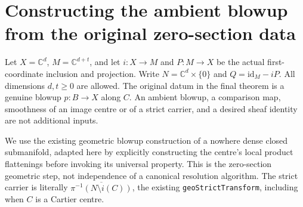 \section{Constructing the ambient blowup from the original zero-section data}

Let $X=\mathbb C^d$, $M=\mathbb C^{d+t}$, and let $i:X\to M$ and
$P:M\to X$ be the actual first-coordinate inclusion and projection. Write
$N=\mathbb C^d\times\{0\}$ and $Q=\mathrm{id}_M-iP$. All dimensions
$d,t\geq0$ are allowed. The original datum in the final theorem is a
genuine blowup $p:B\to X$ along $C$. An ambient blowup, a comparison map,
smoothness of an image centre or of a strict carrier, and a desired sheaf
identity are not additional inputs.

We use the existing geometric blowup construction of a nowhere dense
closed submanifold, adapted here by explicitly constructing the centre's
local product flattenings before invoking its universal property. This
is the zero-section geometric step, not independence of a canonical
resolution algorithm. The strict carrier is literally
$\overline{\pi^{-1}(N\setminus i(C))}$, the existing
\texttt{geoStrictTransform}, including when $C$ is a Cartier centre.


